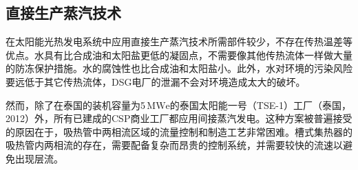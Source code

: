 \subsection{直接生产蒸汽技术}
在太阳能光热发电系统中应用直接生产蒸汽技术所需部件较少，不存在传热温差等优点。水具有比合成油和太阳盐更低的凝固点，不需要像其他传热流体一样做大量的防冻保护措施。水的腐蚀性也比合成油和太阳盐小\cite{Giglio2017}。此外，水对环境的污染风险要远低于其它传热流体，DSG电厂的泄漏不会对环境造成太大的破坏\cite{Fernandez2010}。

然而，除了在泰国的装机容量为5$\,\mathrm{MWe}$的泰国太阳能一号（TSE-1）工厂（泰国，2012）外，所有已建成的CSP商业工厂都应用间接蒸汽发电\cite{Khenissi2015}。这种方案被普遍接受的原因在于，吸热管中两相流区域的流量控制和制造工艺非常困难。槽式集热器的吸热管内两相流的存在，需要配备复杂而昂贵的控制系统，并需要较快的流速以避免出现层流。

